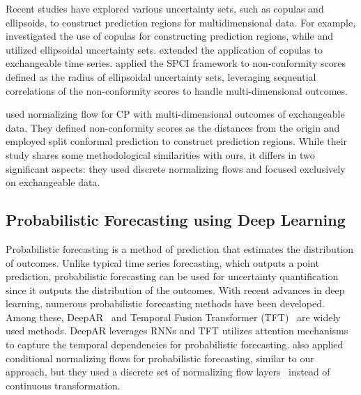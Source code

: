 Recent studies have explored various uncertainty sets, such as copulas and ellipsoids, to construct prediction regions for multidimensional data. For example, \citet{messoudi2021copula} investigated the use of copulas for constructing prediction regions, while \citet{messoudi2022ellipsoidal} and \citet{johnstone2022exact} utilized ellipsoidal uncertainty sets. \citet{sun2022copula} extended the application of copulas to exchangeable time series. \citet{xu2024conformal} applied the SPCI framework to non-conformity scores defined as the radius of ellipsoidal uncertainty sets, leveraging sequential correlations of the non-conformity scores to handle multi-dimensional outcomes.

\citet{anonymous2025contra} used normalizing flow for CP with multi-dimensional outcomes of exchangeable data. They defined non-conformity scores as the distances from the origin and employed split conformal prediction to construct prediction regions. While their study shares some methodological similarities with ours, it differs in two significant aspects: they used discrete normalizing flows and focused exclusively on exchangeable data.


 
\subsection{Probabilistic Forecasting using Deep Learning}

Probabilistic forecasting is a method of prediction that estimates the distribution of outcomes. Unlike typical time series forecasting, which outputs a point prediction, probabilistic forecasting can be used for uncertainty quantification since it outputs the distribution of the outcomes. With recent advances in deep learning, numerous probabilistic forecasting methods have been developed. Among these, DeepAR~\cite{salinas2020deepar} and Temporal Fusion Transformer (TFT)~\cite{lim2021temporal} are widely used methods. DeepAR leverages RNNs and TFT utilizes attention mechanisms to capture the temporal dependencies for probabilistic forecasting. \citet{rasul2020multivariate} also applied conditional normalizing flows for probabilistic forecasting, similar to our approach, but they used a discrete set of normalizing flow layers~\cite{dinh2016density} instead of continuous transformation.